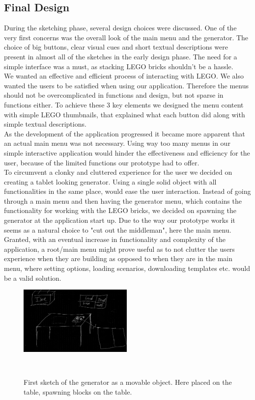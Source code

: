 \subsection{Final Design}
During the sketching phase, several design choices were discussed. One of the very first concerns was the overall look of the main menu and the generator. The choice of big buttons, clear visual cues and short textual descriptions were present in almost all of the sketches in the early design phase. The need for a simple interface was a must, as stacking LEGO bricks shouldn't be a hassle. \\
We wanted an effective and efficient process of interacting with LEGO. We also wanted the users to be satisfied when using our application. Therefore the menus should not be overcomplicated in functions and design, but not sparse in functions either. To achieve these 3 key elements we designed the menu content with simple LEGO thumbnails, that explained what each button did along with simple textual descriptions. \\
As the development of the application progressed it became more  apparent that an actual main menu was not necessary. Using way too many menus in our simple interactive application would hinder the effectiveness and efficiency for the user, because of the limited functions our prototype had to offer. \\ 
To circumvent a clonky and cluttered experience for the user we decided on creating a tablet looking generator. Using a single solid object with all functionalities in the same place, would ease the user interaction. Instead of going through a main menu and then having the generator menu, which contains the functionality for working with the LEGO bricks, we decided on spawning the generator at the application start up. Due to the way our prototype works it seems as a natural choice to "cut out the middleman", here the main menu.  \\ 
Granted, with an eventual increase in functionality and complexity of the application, a root/main menu might prove useful as to not clutter the users experience when they are building as opposed to when they are in the main menu, where setting options, loading scenarios, downloading templates etc. would be a valid solution.\\
\begin{figure}[t]
	\centering
	\includegraphics[width=210px]{figures/Generator/gen6.png}
	\caption{First sketch of the generator as a movable object. Here placed on the table, spawning blocks on the table.}~\label{fig:finaldesign}
\end{figure}
